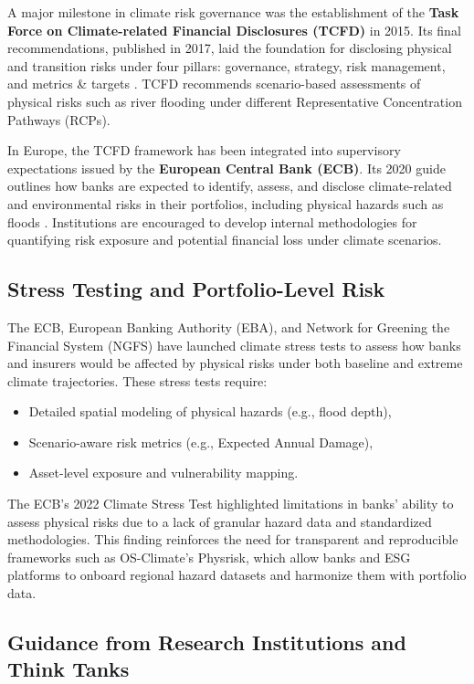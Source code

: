 A major milestone in climate risk governance was the establishment of the \textbf{Task Force on Climate-related Financial Disclosures (TCFD)} in 2015. Its final recommendations, published in 2017, laid the foundation for disclosing physical and transition risks under four pillars: governance, strategy, risk management, and metrics \& targets \cite{tcfd2017}. TCFD recommends scenario-based assessments of physical risks such as river flooding under different Representative Concentration Pathways (RCPs).

In Europe, the TCFD framework has been integrated into supervisory expectations issued by the \textbf{European Central Bank (ECB)}. Its 2020 guide outlines how banks are expected to identify, assess, and disclose climate-related and environmental risks in their portfolios, including physical hazards such as floods \cite{ecb2020}. Institutions are encouraged to develop internal methodologies for quantifying risk exposure and potential financial loss under climate scenarios.

\subsection{Stress Testing and Portfolio-Level Risk}

The ECB, European Banking Authority (EBA), and Network for Greening the Financial System (NGFS) have launched climate stress tests to assess how banks and insurers would be affected by physical risks under both baseline and extreme climate trajectories. These stress tests require:

\begin{itemize}
    \item Detailed spatial modeling of physical hazards (e.g., flood depth),
    \item Scenario-aware risk metrics (e.g., Expected Annual Damage),
    \item Asset-level exposure and vulnerability mapping.
\end{itemize}

The ECB’s 2022 Climate Stress Test highlighted limitations in banks’ ability to assess physical risks due to a lack of granular hazard data and standardized methodologies. This finding reinforces the need for transparent and reproducible frameworks such as OS-Climate’s Physrisk, which allow banks and ESG platforms to onboard regional hazard datasets and harmonize them with portfolio data.

\subsection{Guidance from Research Institutions and Think Tanks}

